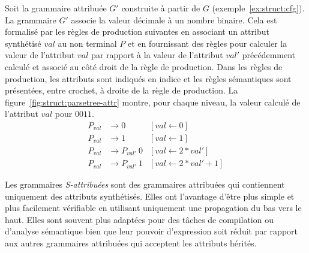 \begin{example}
    \label{ex:struct:cfg-attr}
    Soit la grammaire attribuée $G'$ construite à partir de $G$ (exemple~\ref{ex:struct:cfg}).
    La grammaire $G'$ associe la valeur décimale à un nombre binaire.
    Cela est formalisé par les règles de production suivantes en associant un attribut synthétisé $val$ au non terminal $P$ et en fournissant des règles pour calculer la valeur de l'attribut $val$ par rapport à la valeur de l'attribut $val'$ précédemment calculé et associé au côté droit de la règle de production.
    Dans les règles de production, les attributs sont indiqués en indice et les règles sémantiques sont présentées, entre crochet, à droite de la règle de production.
    La figure~\ref{fig:struct:parsetree-attr} montre, pour chaque niveau, la valeur calculé de l'attribut $val$ pour $0011$.
    \begin{align*}
        P_{val} & \to 0 & [val \gets 0] \\
        P_{val} & \to 1 & [val \gets 1] \\
        P_{val} & \to P_{val'}~0 & [val \gets 2 * val'] \\
        P_{val} & \to P_{val'}~1 & [val \gets 2 * val' + 1]
    \end{align*}
\end{example}

Les grammaires \emph{S-attribuées} sont des grammaires attribuées qui contiennent uniquement des attributs synthétisés.
Elles ont l'avantage d'être plus simple et plus facilement vérifiable en utilisant uniquement une propagation du bas vers le haut.
Elles sont souvent plus adaptées pour des tâches de compilation ou d'analyse sémantique bien que leur pouvoir d'expression soit réduit par rapport aux autres grammaires attribuées qui acceptent les attributs hérités.

